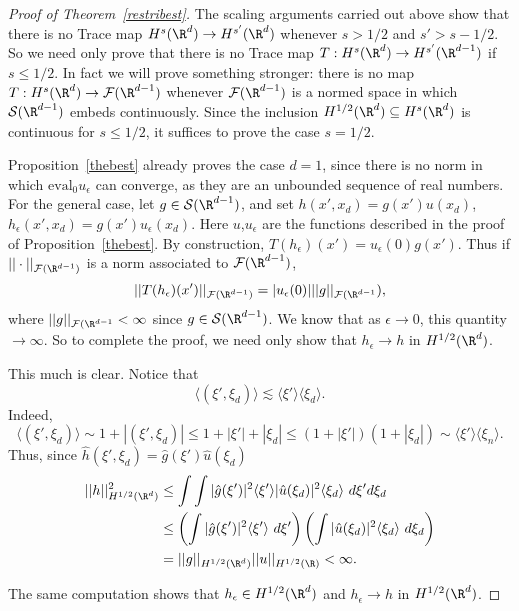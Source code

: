 \documentclass[12pt]{article}
\begin{document}
\begin{proof}[Proof of Theorem~\ref{restribest}]The scaling arguments carried out above show that there is no Trace map $H^s(\R^d) \to H^{s'}(\R^d)$ whenever $s > 1/2$ and $s' > s-1/2$. So we need only prove that there is no Trace map $T: H^s(\R^d) \to H^{s'}(\R^{d-1})$ if $s \leq 1/2$. In fact we will prove something stronger: there is no map $T: H^s(\R^d) \to \mathcal F(\R^{d-1})$ whenever $\mathcal F(\R^{d-1})$ is a normed space in which $\mathcal S(\R^{d-1})$ embeds continuously. Since the inclusion $H^{1/2}(\R^d) \subseteq H^{s}(\R^d)$ is continuous for $s \leq 1/2$, it suffices to prove the case $s=1/2$.

Proposition~\ref{thebest} already proves the case $d = 1$, since there is no norm in which $\text{eval}_0 u_\epsilon$ can converge, as they are an unbounded sequence of real numbers. For the general case, let $g \in \mathcal S(\R^{d-1})$, and set $h(x',x_d) = g(x')u(x_d)$, $h_\epsilon(x',x_d) = g(x')u_\epsilon(x_d)$. Here $u$,$u_\epsilon$ are the functions described in the proof of Proposition~\ref{thebest}. By construction, $T(h_\epsilon)(x') = u_\epsilon(0)g(x')$. Thus if $||\cdot||_{\mathcal F(\R^{d-1})}$ is a norm associated to $\mathcal F(\R^{d-1})$,
\[||T(h_\epsilon)(x')||_{\mathcal F(\R^{d-1})} = |u_\epsilon(0)|||g||_{\mathcal F(\R^{d-1}}),\]
where $||g||_{\mathcal F(\R^{d-1}} < \infty$ since $g \in \mathcal S(\R^{d-1})$. We know that as $\epsilon \to 0$, this quantity $\to \infty$. So to complete the proof, we need only show that $h_\epsilon \to h$ in $H^{1/2}(\R^d)$.

This much is clear. Notice that \[\langle (\xi',\xi_d) \rangle \lesssim \langle \xi' \rangle \langle \xi_d\rangle.\] Indeed,
\[\langle (\xi',\xi_d) \rangle \sim 1+|(\xi',\xi_d)| \leq 1+|\xi'|+|\xi_d| \leq (1+|\xi'|)(1+|\xi_d|) \sim \langle \xi' \rangle \langle \xi_n\rangle.\]
Thus, since $\hat{h}(\xi',\xi_d) = \hat{g}(\xi')\hat{u}(\xi_d)$
\begin{align*}
||h||_{H^{1/2}(\R^d)}^2& \leq \int\int |\hat{g}(\xi')|^2\langle \xi'\rangle|\hat{u}(\xi_d)|^2\langle \xi_d\rangle\ d\xi'd\xi_d\\
&\leq \left(\int |\hat{g}(\xi')|^2\langle \xi'\rangle\ d\xi'\right)\left(\int |\hat{u}(\xi_d)|^2\langle \xi_d\rangle\ d\xi_d\right)\\
&= ||g||_{H^{1/2}(\R^d)}||u||_{H^{1/2}(\R)} < \infty.\end{align*}

The same computation shows that $h_\epsilon \in H^{1/2}(\R^d)$ and $h_\epsilon \to h$ in $H^{1/2}(\R^d)$.\end{proof}
\end{document}
